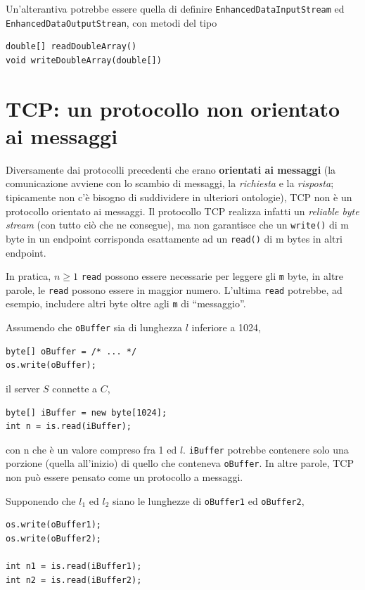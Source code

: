 \documentclass[\fontsizeclass,twocolumn]{\classname}
\theoremstyle{definition}
\theoremstyle{definition}
\begin{document}
Un'alterantiva potrebbe essere quella di definire
\texttt{EnhancedDataInputStream} ed \texttt{EnhancedDataOutputStrean}, con
metodi del tipo 

\begin{lstlisting}
double[] readDoubleArray()
void writeDoubleArray(double[])
\end{lstlisting}

\section{TCP: un protocollo non orientato ai messaggi}

Diversamente dai protocolli precedenti che erano \textbf{orientati ai messaggi}
(la comunicazione avviene con lo scambio di messaggi, la \emph{richiesta} e la
\emph{risposta}; tipicamente non c'è bisogno di suddividere in ulteriori
ontologie), TCP non è un protocollo orientato ai messaggi. Il protocollo TCP
realizza infatti un \emph{reliable byte stream} (con tutto ciò che ne
consegue), ma non garantisce che un \texttt{write()} di m byte in un endpoint
corrisponda esattamente ad un \texttt{read()} di m bytes in altri endpoint.

In pratica, $n \geq 1$ \texttt{read} possono essere necessarie per leggere gli
\texttt{m} byte, in altre parole, le \texttt{read} possono essere in maggior
numero. L'ultima \texttt{read} potrebbe, ad esempio, includere altri byte oltre
agli \texttt{m} di ``messaggio''.

Assumendo che \texttt{oBuffer} sia di lunghezza $l$ inferiore a 1024,

\begin{lstlisting}
byte[] oBuffer = /* ... */
os.write(oBuffer);
\end{lstlisting}

il server $S$ connette a $C$,

\begin{lstlisting}
byte[] iBuffer = new byte[1024];
int n = is.read(iBuffer);
\end{lstlisting}

con n che è un valore compreso fra 1 ed $l$. \texttt{iBuffer} potrebbe
contenere solo una porzione (quella all'inizio) di quello che conteneva
\texttt{oBuffer}. In altre parole, TCP non può essere pensato come un
protocollo a messaggi.

Supponendo che $l_1$ ed $l_2$ siano le lunghezze di \texttt{oBuffer1} ed \texttt{oBuffer2},



\begin{lstlisting}
os.write(oBuffer1);
os.write(oBuffer2);

int n1 = is.read(iBuffer1);
int n2 = is.read(iBuffer2);
\end{lstlisting}
\end{document}

